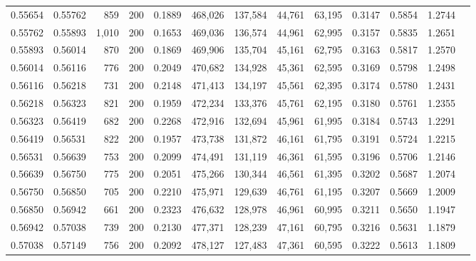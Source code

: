 \begin{tabular}{rrrrrrrrrrrrr}
0.55654 & 0.55762 &    859 & 200 &                                     0.1889 & 468,026 & 137,584 &  44,761 &  63,195 & 0.3147 & 0.5854 & 1.2744 \\
0.55762 & 0.55893 &  1,010 & 200 &                                     0.1653 & 469,036 & 136,574 &  44,961 &  62,995 & 0.3157 & 0.5835 & 1.2651 \\
0.55893 & 0.56014 &    870 & 200 &                                     0.1869 & 469,906 & 135,704 &  45,161 &  62,795 & 0.3163 & 0.5817 & 1.2570 \\
0.56014 & 0.56116 &    776 & 200 &                                     0.2049 & 470,682 & 134,928 &  45,361 &  62,595 & 0.3169 & 0.5798 & 1.2498 \\
0.56116 & 0.56218 &    731 & 200 &                                     0.2148 & 471,413 & 134,197 &  45,561 &  62,395 & 0.3174 & 0.5780 & 1.2431 \\
0.56218 & 0.56323 &    821 & 200 &                                     0.1959 & 472,234 & 133,376 &  45,761 &  62,195 & 0.3180 & 0.5761 & 1.2355 \\
0.56323 & 0.56419 &    682 & 200 &                                     0.2268 & 472,916 & 132,694 &  45,961 &  61,995 & 0.3184 & 0.5743 & 1.2291 \\
0.56419 & 0.56531 &    822 & 200 &                                     0.1957 & 473,738 & 131,872 &  46,161 &  61,795 & 0.3191 & 0.5724 & 1.2215 \\
0.56531 & 0.56639 &    753 & 200 &                                     0.2099 & 474,491 & 131,119 &  46,361 &  61,595 & 0.3196 & 0.5706 & 1.2146 \\
0.56639 & 0.56750 &    775 & 200 &                                     0.2051 & 475,266 & 130,344 &  46,561 &  61,395 & 0.3202 & 0.5687 & 1.2074 \\
0.56750 & 0.56850 &    705 & 200 &                                     0.2210 & 475,971 & 129,639 &  46,761 &  61,195 & 0.3207 & 0.5669 & 1.2009 \\
0.56850 & 0.56942 &    661 & 200 &                                     0.2323 & 476,632 & 128,978 &  46,961 &  60,995 & 0.3211 & 0.5650 & 1.1947 \\
0.56942 & 0.57038 &    739 & 200 &                                     0.2130 & 477,371 & 128,239 &  47,161 &  60,795 & 0.3216 & 0.5631 & 1.1879 \\
0.57038 & 0.57149 &    756 & 200 &                                     0.2092 & 478,127 & 127,483 &  47,361 &  60,595 & 0.3222 & 0.5613 & 1.1809 \\

\end{tabular}
